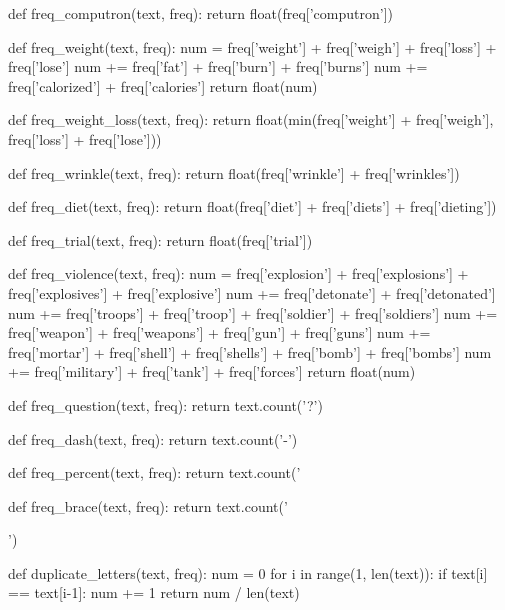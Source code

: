 \documentclass[11pt]{article}
\begin{document}
\begin{python}
def freq_computron(text, freq):
    return float(freq['computron'])

def freq_weight(text, freq):
    num = freq['weight'] + freq['weigh'] + freq['loss'] + freq['lose']
    num += freq['fat'] + freq['burn'] + freq['burns']
    num += freq['calorized'] + freq['calories']
    return float(num)

def freq_weight_loss(text, freq):
    return float(min(freq['weight'] + freq['weigh'], freq['loss'] + freq['lose']))

def freq_wrinkle(text, freq):
    return float(freq['wrinkle'] + freq['wrinkles'])

def freq_diet(text, freq):
    return float(freq['diet'] + freq['diets'] + freq['dieting'])

def freq_trial(text, freq):
    return float(freq['trial'])

def freq_violence(text, freq):
    num = freq['explosion'] + freq['explosions'] + freq['explosives'] + freq['explosive']
    num += freq['detonate'] + freq['detonated']
    num += freq['troops'] + freq['troop'] + freq['soldier'] + freq['soldiers']
    num += freq['weapon'] + freq['weapons'] + freq['gun'] + freq['guns']
    num += freq['mortar'] + freq['shell'] + freq['shells'] + freq['bomb'] + freq['bombs']
    num += freq['military'] + freq['tank'] + freq['forces']
    return float(num)

def freq_question(text, freq):
    return text.count('?')

def freq_dash(text, freq):
    return text.count('-')

def freq_percent(text, freq):
    return text.count('%

def freq_brace(text, freq):
    return text.count('{')

def duplicate_letters(text, freq):
    num = 0
    for i in range(1, len(text)):
        if text[i] == text[i-1]:
            num += 1
    return num / len(text)

}
\end{python}
\end{document}
